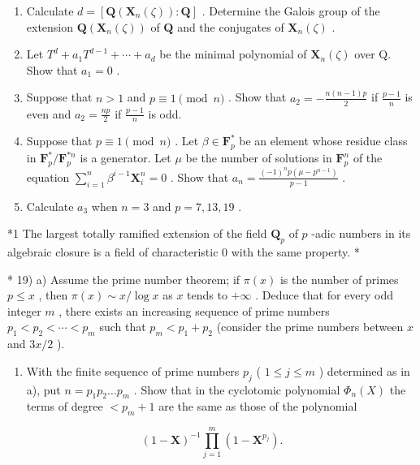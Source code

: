 \begin{enumerate}
\def\labelenumi{\alph{enumi})}
\item
  Calculate \(d = [\mathbf{Q}(\mathbf{X}_n(\zeta)) : \mathbf{Q}]\) . Determine the Galois group of the extension \(\mathbf{Q}(\mathbf{X}_n(\zeta))\) of \(\mathbf{Q}\) and the conjugates of \(\mathbf{X}_n(\zeta)\) .
\item
  Let \(T^{d} + a_{1}T^{d-1} + \cdots + a_{d}\) be the minimal polynomial of \(\mathbf{X}_{n}(\zeta)\) over Q. Show that \(a_{1} = 0\) .
\item
  Suppose that \(n > 1\) and \(p \equiv 1 \pmod{n}\) . Show that \(a_2 = -\frac{n(n - 1)p}{2}\) if \(\frac{p - 1}{n}\) is even and \(a_2 = \frac{np}{2}\) if \(\frac{p - 1}{n}\) is odd.
\item
  Suppose that \(p \equiv 1 \pmod{n}\) . Let \(\beta \in \mathbf{F}_p^*\) be an element whose residue class in \(\mathbf{F}_p^* / \mathbf{F}_p^{*n}\) is a generator. Let \(\mu\) be the number of solutions in \(\mathbf{F}_p^n\) of the equation \(\sum_{i=1}^{n} \beta^{i-1} \mathbf{X}_i^n = 0\) . Show that \(a_n = \frac{(-1)^n p(\mu - p^{n-1})}{p-1}\) .
\item
  Calculate \(a_3\) when \(n = 3\) and \(p = 7, 13, 19\) .
\end{enumerate}

*1 The largest totally ramified extension of the field \(\mathbf{Q}_p\) of \(p\) -adic numbers in its algebraic closure is a field of characteristic 0 with the same property. *

* 19) a) Assume the prime number theorem; if \(\pi(x)\) is the number of primes \(p \leqslant x\) , then \(\pi(x) \sim x / \log x\) as \(x\) tends to \(+\infty\) . Deduce that for every odd integer \(m\) , there exists an increasing sequence of prime numbers \(p_1 < p_2 < \cdots < p_m\) such that \(p_m < p_1 + p_2\) (consider the prime numbers between \(x\) and \(3x/2\) ).

\begin{enumerate}
\def\labelenumi{\alph{enumi})}
\setcounter{enumi}{1}
\tightlist
\item
  With the finite sequence of prime numbers \(p_{j}\) ( \(1 \leq j \leq m\) ) determined as in a), put \(n = p_{1}p_{2} \ldots p_{m}\) . Show that in the cyclotomic polynomial \(\Phi_{n}(X)\) the terms of degree \(< p_{m} + 1\) are the same as those of the polynomial
\end{enumerate}

\[
(1 - \mathbf {X}) ^ {- 1} \prod_ {j = 1} ^ {m} (1 - \mathbf {X} ^ {p _ {j}}).
\]

